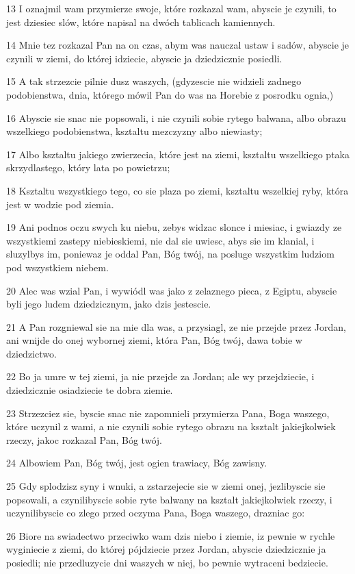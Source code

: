\par 13 I oznajmil wam przymierze swoje, które rozkazal wam, abyscie je czynili, to jest dziesiec slów, które napisal na dwóch tablicach kamiennych.
\par 14 Mnie tez rozkazal Pan na on czas, abym was nauczal ustaw i sadów, abyscie je czynili w ziemi, do której idziecie, abyscie ja dziedzicznie posiedli.
\par 15 A tak strzezcie pilnie dusz waszych, (gdyzescie nie widzieli zadnego podobienstwa, dnia, którego mówil Pan do was na Horebie z posrodku ognia,)
\par 16 Abyscie sie snac nie popsowali, i nie czynili sobie rytego balwana, albo obrazu wszelkiego podobienstwa, ksztaltu mezczyzny albo niewiasty;
\par 17 Albo ksztaltu jakiego zwierzecia, które jest na ziemi, ksztaltu wszelkiego ptaka skrzydlastego, który lata po powietrzu;
\par 18 Ksztaltu wszystkiego tego, co sie plaza po ziemi, ksztaltu wszelkiej ryby, która jest w wodzie pod ziemia.
\par 19 Ani podnos oczu swych ku niebu, zebys widzac slonce i miesiac, i gwiazdy ze wszystkiemi zastepy niebieskiemi, nie dal sie uwiesc, abys sie im klanial, i sluzylbys im, poniewaz je oddal Pan, Bóg twój, na posluge wszystkim ludziom pod wszystkiem niebem.
\par 20 Alec was wzial Pan, i wywiódl was jako z zelaznego pieca, z Egiptu, abyscie byli jego ludem dziedzicznym, jako dzis jestescie.
\par 21 A Pan rozgniewal sie na mie dla was, a przysiagl, ze nie przejde przez Jordan, ani wnijde do onej wybornej ziemi, która Pan, Bóg twój, dawa tobie w dziedzictwo.
\par 22 Bo ja umre w tej ziemi, ja nie przejde za Jordan; ale wy przejdziecie, i dziedzicznie osiadziecie te dobra ziemie.
\par 23 Strzezciez sie, byscie snac nie zapomnieli przymierza Pana, Boga waszego, które uczynil z wami, a nie czynili sobie rytego obrazu na ksztalt jakiejkolwiek rzeczy, jakoc rozkazal Pan, Bóg twój.
\par 24 Albowiem Pan, Bóg twój, jest ogien trawiacy, Bóg zawisny.
\par 25 Gdy splodzisz syny i wnuki, a zstarzejecie sie w ziemi onej, jezlibyscie sie popsowali, a czynilibyscie sobie ryte balwany na ksztalt jakiejkolwiek rzeczy, i uczynilibyscie co zlego przed oczyma Pana, Boga waszego, drazniac go:
\par 26 Biore na swiadectwo przeciwko wam dzis niebo i ziemie, iz pewnie w rychle wyginiecie z ziemi, do której pójdziecie przez Jordan, abyscie dziedzicznie ja posiedli; nie przedluzycie dni waszych w niej, bo pewnie wytraceni bedziecie.
